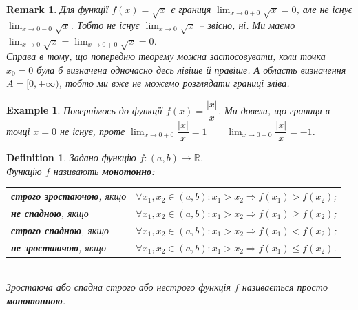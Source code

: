 \documentclass[a4paper, 14pt]{article}
\theoremstyle{theoremdd}
\theoremstyle{theoremdd}
\newtheorem{definition}[theorem]{Definition}
\theoremstyle{theoremdd}
\theoremstyle{theoremdd}
\newtheorem{example}[theorem]{Example}
\theoremstyle{theoremdd}
\theoremstyle{theoremdd}
\newtheorem{remark}[theorem]{Remark}
\theoremstyle{theoremdd}
\theoremstyle{theoremdd}
\begin{document}
\begin{remark}
Для функції $f(x) = \sqrt{x}$ є границя $\displaystyle\lim_{x \to 0+0} \sqrt{x} = 0$, але не існує $\displaystyle\lim_{x \to 0-0} \sqrt{x}$. Тобто не існує $\displaystyle\lim_{x \to 0} \sqrt{x}$ -- звісно, ні. Ми маємо $\displaystyle\lim_{x \to 0} \sqrt{x} = \lim_{x \to 0+0} \sqrt{x} = 0$.\\
Справа в тому, що попередню теорему можна застосовувати, коли точка $x_0 = 0$ була б визначена одночасно десь лівіше й правіше. А область визначення $A = [0,+\infty)$, тобто ми вже не можемо розглядати границі зліва.
\end{remark}

\begin{example}
Повернімось до функції $f(x) = \dfrac{|x|}{x}$. Ми довели, що границя в точці $x=0$ не існує, проте $\displaystyle\lim_{x \to 0+0} \dfrac{|x|}{x} = 1 \qquad \lim_{x \to 0-0} \dfrac{|x|}{x} = -1$.
\\ %
\end{example}

\begin{definition}
Задано функцію $f \colon (a,b) \to \mathbb{R}$.\\
Функцію $f$ називають \textbf{монотонно}:\\
\begin{tabular}{ll}
\textbf{строго зростаючою}, якщо & $\forall x_1,x_2 \in (a,b): x_1 > x_2 \Rightarrow f(x_1)>f(x_2)$;\\
\textbf{не спадною}, якщо & $\forall x_1,x_2 \in (a,b): x_1 > x_2 \Rightarrow f(x_1) \geq f(x_2)$;\\
\textbf{строго спадною}, якщо & $\forall x_1,x_2 \in (a,b): x_1 > x_2 \Rightarrow f(x_1) < f(x_2)$;\\
\textbf{не зростаючою}, якщо & $\forall x_1,x_2 \in (a,b): x_1 > x_2 \Rightarrow f(x_1) \leq f(x_2)$.
\end{tabular}\\
Зростаюча або спадна строго або нестрого функція $f$ називається просто \textbf{монотонною}.
\end{definition}
\end{document}

